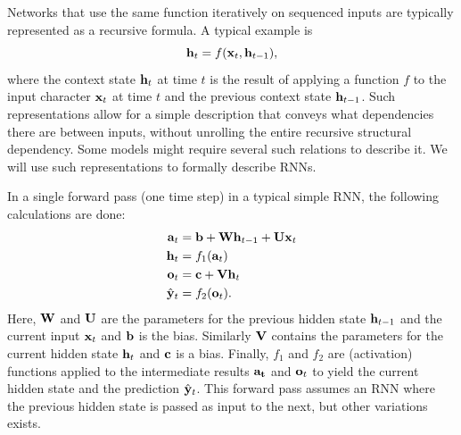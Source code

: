 \documentclass[a4paper,12pt]{article}
\begin{document}
Networks that use the same function iteratively on sequenced inputs are typically represented as a recursive formula. A typical example is
\[ \mathbf{ h }_t = f{\mathopen{} \left( \mathbf{ x }_t, \mathbf{ h }_{t - 1} \right) \mathclose{}}, \]
where the context state $\mathbf{ h }_t$ at time $t$ is the result of applying a function $f$ to the input character $\mathbf{ x }_t$ at time $t$ and the previous context state $\mathbf{ h }_{t - 1}$. Such representations allow for a simple description that conveys what dependencies there are between inputs, without unrolling the entire recursive structural dependency. Some models might require several such relations to describe it. We will use such representations to formally describe RNNs.

In a single forward pass (one time step) in a typical simple RNN, the following calculations are done:
\begin{align*}
    \mathbf{ a }_t &= \mathbf{ b } + \mathbf{ Wh }_{t - 1} + \mathbf{ Ux }_t\\
    \mathbf{ h }_t &= f_1 {\mathopen{} \left( \mathbf{ a }_t \right) \mathclose{}}\\
    \mathbf{ o }_t &= \mathbf{ c } + \mathbf{ Vh }_t\\
    \hat{\mathbf{ y }}_t &= f_2 {\mathopen{} \left( \mathbf{ o }_t \right) \mathclose{}}.
\end{align*}
Here, $\mathbf{ W }$ and $\mathbf{ U }$ are the parameters for the previous hidden state $\mathbf{ h }_{t-1}$ and the current input $\mathbf{ x }_t$ and $\mathbf{ b }$ is the bias. Similarly $\mathbf{ V }$ contains the parameters for the current hidden state $\mathbf{ h }_t$ and $\mathbf{ c }$ is a bias. Finally, $f_1$ and $f_2$ are (activation) functions applied to the intermediate results $\mathbf{ a_t }$ and $\mathbf{ o }_t$ to yield the current hidden state and the prediction $\hat{\mathbf{ y }}_t$. This forward pass assumes an RNN where the previous hidden state is passed as input to the next, but other variations exists.

\end{document}
